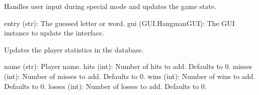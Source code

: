 \documentclass[letterpaper,10pt,english]{sphinxmanual}
\begin{document}
\begin{fulllineitems}
\label{\detokenize{modules:Game_Logic.special_on_submit}}
\pysigstartsignatures
{}
\pysigstopsignatures
\sphinxAtStartPar
Handles user input during special mode and updates the game state.
\begin{description}
\sphinxAtStartPar
entry (str): The guessed letter or word.
gui (GUI.HangmanGUI): The GUI instance to update the interface.

\end{description}

\end{fulllineitems}


\begin{fulllineitems}
\label{\detokenize{modules:Game_Logic.update_statistics}}
\pysigstartsignatures
{}
\pysigstopsignatures
\sphinxAtStartPar
Updates the player statistics in the database.
\begin{description}
\sphinxAtStartPar
name (str): Player name.
hits (int): Number of hits to add. Defaults to 0.
misses (int): Number of misses to add. Defaults to 0.
wins (int): Number of wins to add. Defaults to 0.
losses (int): Number of losses to add. Defaults to 0.

\end{description}

\end{fulllineitems}
\end{document}
